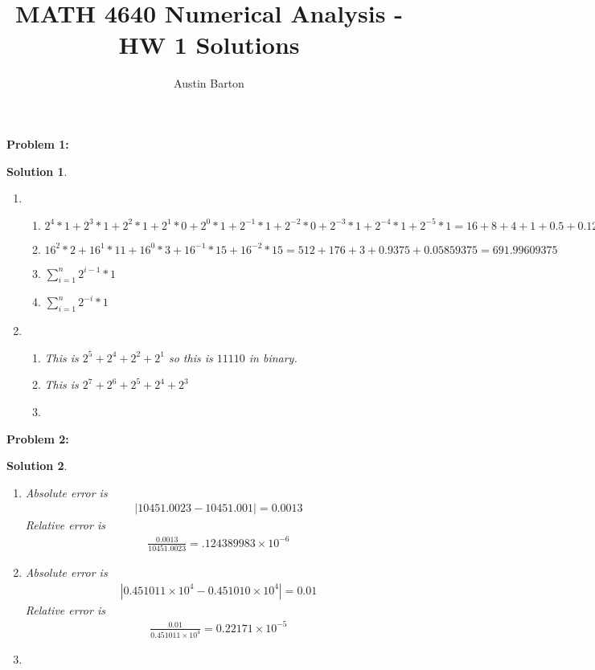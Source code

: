 \documentclass[12pt, letterpaper]{article}
\title{MATH 4640 Numerical Analysis - HW 1 Solutions}
\author{Austin Barton}
\theoremstyle{nonumberplain}
\newtheorem{sol}{Solution}
\begin{document}
\maketitle

\vspace{2em}

\hspace{18pt}\textbf{Problem 1:} \medskip
\begin{sol}
    \begin{enumerate}[label=\roman*.]
        \item
        \begin{enumerate}[label=\alph*)]
            \item $2^4 * 1 + 2^3 * 1 + 2^2 * 1 + 2^1 * 0 + 2^0 * 1 + 2^{-1} * 1 + 2^{-2} * 0 + 2^{-3} * 1 + 2^{-4} * 1 + 2^{-5} * 1 = 16 + 8 + 4 + 1 + 0.5 + 0.125 + 0.0625 +  0.03125 = 29.71875$
            \item $16^2 * 2 + 16^1 * 11 + 16^0 * 3 + 16^{-1} * 15 + 16^{-2} * 15 = 512 + 176 + 3 + 0.9375 + 0.05859375 = 691.99609375$
            \item $\sum_{i = 1}^n 2^{i-1} * 1$
            \item $\sum_{i = 1}^n 2^{-i} * 1$
        \end{enumerate}
        \item
        \begin{enumerate}[label=\alph*)]
            \item This is $2^5 + 2^4 + 2^2 + 2^1$ so this is $11110$ in binary.
            \item This is $2^7 +2^6 + 2^5 + 2^4 + 2^3$
            \item
        \end{enumerate}
    \end{enumerate}
\end{sol}

\hspace{18pt}\textbf{Problem 2:} \medskip
\begin{sol}
    \begin{enumerate}[label=\alph*)]
        \item Absolute error is
            \begin{gather*}
                |10451.0023 - 10451.001| = 0.0013
            \end{gather*}
            Relative error is
            \begin{gather*}
                \frac{0.0013}{10451.0023} = .124389983 \times 10^{-6}
            \end{gather*}
        \item Absolute error is
            \begin{gather*}
                |0.451011 \times 10^4 - 0.451010\times 10^4| = 0.01
            \end{gather*}
            Relative error is
            \begin{gather*}
                \frac{0.01}{0.451011\times 10^4} = 0.22171 \times 10^{-5}
            \end{gather*}
        \item 
    \end{enumerate}
\end{sol}
\end{document}

